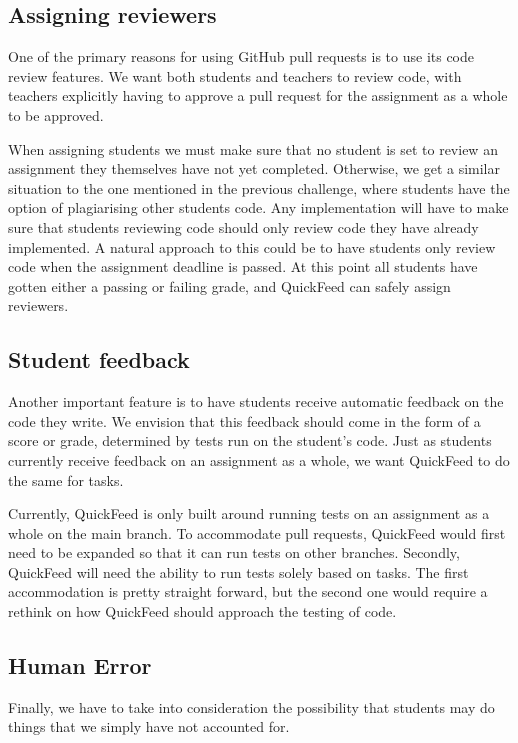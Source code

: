 \subsection{Assigning reviewers}

One of the primary reasons for using GitHub pull requests is to use its code review features.
We want both students and teachers to review code, with teachers explicitly having to approve a pull request for the assignment as a whole to be approved.

When assigning students we must make sure that no student is set to review an assignment they themselves have not yet completed.
Otherwise, we get a similar situation to the one mentioned in the previous challenge, where students have the option of plagiarising other students code.
Any implementation will have to make sure that students reviewing code should only review code they have already implemented.
A natural approach to this could be to have students only review code when the assignment deadline is passed.
At this point all students have gotten either a passing or failing grade, and QuickFeed can safely assign reviewers.


\subsection{Student feedback}

Another important feature is to have students receive automatic feedback on the code they write.
We envision that this feedback should come in the form of a score or grade, determined by tests run on the student's code.
Just as students currently receive feedback on an assignment as a whole, we want QuickFeed to do the same for tasks.

Currently, QuickFeed is only built around running tests on an assignment as a whole on the main branch.
To accommodate pull requests, QuickFeed would first need to be expanded so that it can run tests on other branches.
Secondly, QuickFeed will need the ability to run tests solely based on tasks.
The first accommodation is pretty straight forward, but the second one would require a rethink on how QuickFeed should approach the testing of code.

\subsection{Human Error}
Finally, we have to take into consideration the possibility that students may do things that we simply have not accounted for.

